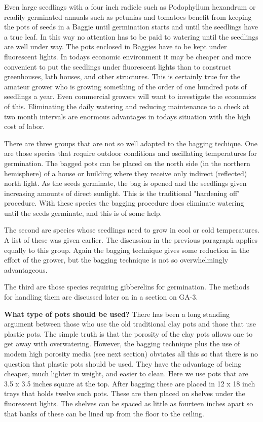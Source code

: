 Even large seedlings with a four inch radicle such as Podophyllum hexandrum
or readily germinated annuals such as petunias and tomatoes benefit from keeping
the pots of seeds in a Baggie until germination starts and until the seedlings have a
true leaf. In this way no attention has to be paid to watering until the seedlings are well
under way. The pots enclosed in Baggies have to be kept under fluorescent lights.
In todays economic environment it may be cheaper and more convenient to put
the seedlings under fluorescent lights than to construct greenhouses, lath houses, and
other structures. This is certainly true for the amateur grower who is growing
something of the order of one hundred pots of seedlings a year. Even commercial
growers will want to investigate the economics of this. Eliminating the daily watering
and reducing maintenance to a check at two month intervals are enormous
advantages in todays situation with the high cost of labor.

There are three groups that are not so well adapted to the bagging techique.
One are those species that require outdoor conditions and oscillating temperatures for
germination. The bagged pots can be placed on the north side (in the northern
hemisphere) of a house or building where they receive only indirect (reflected) north
light. As the seeds germinate, the bag is opened and the seedlings given increasing
amounts of direct sunlight. This is the traditional "hardening off" procedure. With these
species the bagging procedure does eliminate watering until the seeds germinate,
and this is of some help.

The second are species whose seedlings need to grow in cool or cold
temperatures. A list of these was given earlier. The discussion in the previous
paragraph applies equally to this group. Again the bagging technique gives some
reduction in the effort of the grower, but the bagging technique is not so
overwhelmingly advantageous.

The third are those species requiring gibberelins for germination. The methods
for handling them are discussed later on in a section on GA-3.

\textbf{What type of pots should be used?} There has been a long standing
argument between those who use the old traditional clay pots and those that use
plastic pots. The simple truth is that the porosity of the clay pots allows one to get
away with overwatering. However, the bagging technique plus the use of modem high
porosity media (see next section) obviates all this so that there is no question that
plastic pots should be used. They have the advantage of being cheaper, much lighter
in weight, and easier to clean. Here we use pots that are 3.5 x 3.5 inches square at
the top. After bagging these are placed in 12 x 18 inch trays that holds twelve such
pots. These are then placed on shelves under the fluorescent lights. The shelves can
be spaced as little as fourteen inches apart so that banks of these can be lined up from
the floor to the ceiling.

